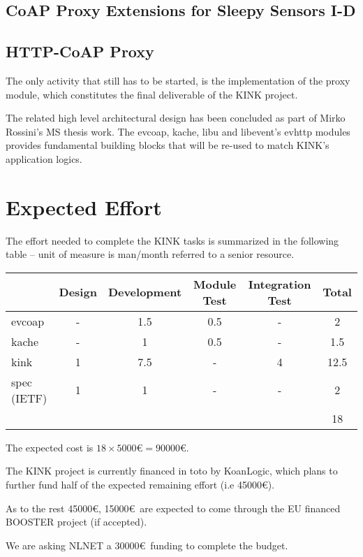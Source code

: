 \documentclass[12pt]{article}
\begin{document}
\subsection{CoAP Proxy Extensions for Sleepy Sensors I-D}


\subsection{HTTP-CoAP Proxy}
The only activity that still has to be started, is the implementation of the proxy module, which constitutes the final deliverable of the KINK project. 

The related high level architectural design has been concluded as part of Mirko Rossini's MS thesis work.  The evcoap, kache, libu and libevent's evhttp modules provides fundamental building blocks that will be re-used to match KINK's application logics.

\section{Expected Effort}
The effort needed to complete the KINK tasks is summarized in the following table -- unit of measure is man/month referred to a senior resource.

\begin{center}
\begin{tabular}{|l|c|c|c|c|c|}
	\hline 
	  & Design & Development & Module Test & Integration Test & Total \\
	\hline 
	evcoap & - & 1.5 & 0.5 & - & 2 \\
	\hline
	kache & - & 1 & 0.5 & - & 1.5 \\
	\hline
	kink & 1 & 7.5 & - & 4 & 12.5 \\
	\hline
	spec (IETF) & 1 & 1 & - & - & 2 \\
	\hline
	\multicolumn{5}{|c|}{} & 18 \\
	\hline
\end{tabular}
\end{center}

The expected cost is $18 \times 5000$\euro $= 90000$\euro. 

The KINK project is currently financed in toto by KoanLogic, which plans to further fund half of the expected remaining effort (i.e 45000\euro).

As to the rest 45000\euro, 15000\euro~are expected to come through the EU financed BOOSTER project (if accepted).

We are asking NLNET a 30000\euro~funding to complete the budget.
\end{document}

